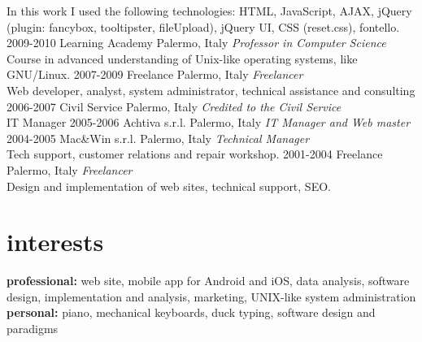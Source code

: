 \documentclass[]{friggeri-cv} %
\begin{document}
\begin{entrylist}
{In this work I used the following technologies: HTML,
JavaScript, AJAX, jQuery (plugin: fancybox, tooltipster, fileUpload),
jQuery UI, CSS (reset.css), fontello.
}
\entry
{2009-2010}
{Learning Academy}
{Palermo, Italy}
{\emph{Professor in Computer Science} \\
Course in advanced understanding of Unix-like operating systems, like GNU/Linux.
}
\entry
{2007-2009}
{Freelance}
{Palermo, Italy}
{\emph{Freelancer} \\
Web developer, analyst, system administrator, technical assistance and consulting
}
\entry
{2006-2007}
{Civil Service}
{Palermo, Italy}
{\emph{Credited to the Civil Service} \\
IT Manager
}
\entry
{2005-2006}
{Achtiva s.r.l.}
{Palermo, Italy}
{\emph{IT Manager and Web master}
}
\entry
{2004-2005}
{Mac\&Win s.r.l.}
{Palermo, Italy}
{\emph{Technical Manager} \\
Tech support, customer relations and repair workshop.
}
\entry
{2001-2004}
{Freelance}
{Palermo, Italy}
{\emph{Freelancer} \\
Design and implementation of web sites, technical support, SEO.
}
\end{entrylist}

\section{interests}
\textbf{professional:} web site, mobile app for Android and iOS, data analysis,
software design, implementation and analysis, marketing, UNIX-like system
administration \\
\textbf{personal:} piano, mechanical keyboards, duck typing, software design
and paradigms
\end{document}

